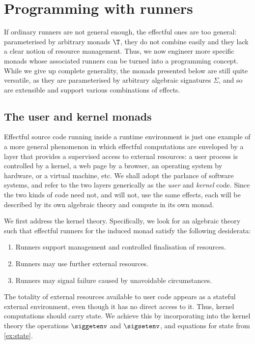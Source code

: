 
\section{Programming with runners}
\label{sec:programming-with-runners}

If ordinary runners are not general enough, the effectful ones are too general: 
parameterised by arbitrary monads $\T$, they do
not combine easily and they lack a clear notion of resource management. Thus,
we now engineer more specific monads whose associated runners can be turned into a
programming concept.
%
While we give up complete generality, the monads presented below are still quite
versatile, as they are parameterised by arbitrary algebraic signatures $\Sigma$,
and so are extensible and support various combinations of effects.

\subsection{The user and kernel monads}
\label{sec:user-kernel-monads}

Effectful source code running inside a runtime environment is just one example of a more
general phenomenon in which effectful computations are enveloped by a layer that provides
a supervised access to external resources: a user process is controlled by a kernel, a web
page by a browser, an operating system by hardware, or a virtual machine, etc. We shall
adopt the parlance of software systems, and refer to the two layers generically as the
\emph{user} and \emph{kernel} code.
%
Since the two kinds of code need not, and will not, use the same effects, each
will be described by its own algebraic theory and compute in its own monad.

We first address the kernel theory. 
Specifically, we look for an algebraic theory such that effectful runners for the induced monad
satisfy the following desiderata:
%
\begin{enumerate}
\item Runners support management and controlled finalisation of resources.
\item Runners may use further external resources.
\item Runners may signal failure caused by unavoidable circumstances.
\end{enumerate}

The totality of external resources
available to user code appears as a stateful external environment, even though it
has no direct access to it. Thus, kernel computations should carry state. We
achieve this by incorporating into the kernel theory the operations $\siggetenv$
and $\sigsetenv$, and equations for state from \cref{ex:state}.

